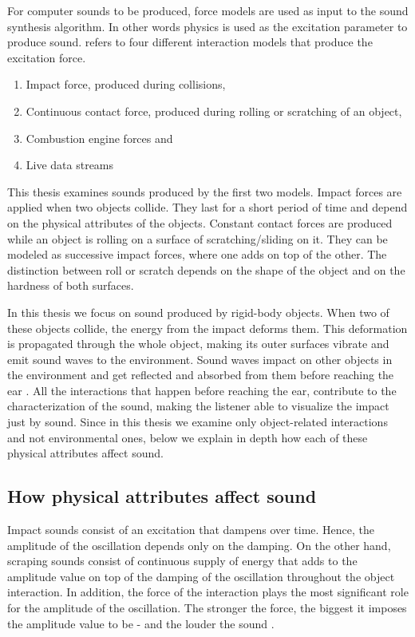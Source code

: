 For computer sounds to be produced, force models are used as input to the sound synthesis algorithm. In other words physics is used as the excitation parameter to produce sound. \cite{van2003modal} refers to four different interaction models that produce the excitation force.

\begin{enumerate}
\item Impact force, produced during collisions,
\item Continuous contact force, produced during rolling or scratching of an object,
\item Combustion engine forces and
\item Live data streams
\end{enumerate}

This thesis examines sounds produced by the first two models. Impact forces are applied when two objects collide. They last for a short period of time and depend on the physical attributes of the objects. Constant contact forces are produced while an object is rolling on a surface of scratching/sliding on it. They can be modeled as successive impact forces, where one adds on top of the other. The distinction between roll or scratch depends on the shape of the object and on the hardness of both surfaces.

In this thesis we focus on sound produced by rigid-body objects. When two of these objects collide, the energy from the impact deforms them. This deformation is propagated through the whole object, making its outer surfaces vibrate and emit sound waves to the environment. Sound waves impact on other objects in the environment and get reflected and absorbed from them before reaching the ear \cite{van1998sounds}. All the interactions that happen before reaching the ear, contribute to the characterization of the sound, making the listener able to visualize the impact just by sound. Since in this thesis we examine only object-related interactions and not environmental ones, below we explain in depth how each of these physical attributes affect sound.

\subsection{How physical attributes affect sound}

Impact sounds consist of an excitation that dampens over time. Hence, the amplitude of the oscillation depends only on the damping. On the other hand, scraping sounds consist of continuous supply of energy that adds to the amplitude value on top of the damping of the oscillation throughout the object interaction. In addition, the force of the interaction plays the most significant role for the amplitude of the oscillation. The stronger the force, the biggest it imposes the amplitude value to be - and the louder the sound \cite{gaver1993world}.

